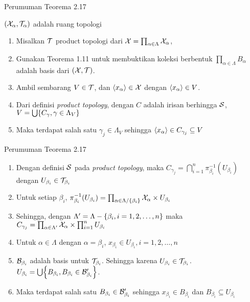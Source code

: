\begin{frame}{Perumuman Teorema 2.17}
    \begin{tcolorbox}[enhanced,title=Teorema 2.30 (Bukti), frame style tile={width=\paperwidth}{\wallpaper}]
        $(\nX_\alpha,\nT_\alpha)$ adalah ruang topologi
        \begin{enumerate}
            \item Misalkan $\nT$ product topologi dari $\nX = \prod_{\alpha \in \Lambda}\nX_\alpha$,
            \item Gunakan Teorema 1.11 untuk membuktikan koleksi berbentuk $\prod_{\alpha \in \Lambda}B_\alpha$ 
            adalah basis dari $(\nX,\nT)$.
            \item Ambil sembarang $V \in \nT$, dan $\seq*{x_\alpha} \in \nX$ dengan $\seq*{x_\alpha}\in V$.
            \item Dari definisi \textit{product topology}, dengan $C$ adalah irisan berhingga $\nS$, $V=\bigcup\set*{C_\gamma, \gamma \in \Lambda_V}$
            \item Maka terdapat salah satu $\gamma_j\in\Lambda_V$ sehingga  $\seq*{x_\alpha} \in C_{\gamma_j} \subseteq V$
        \end{enumerate}
    \end{tcolorbox}
\end{frame}

\begin{frame}{Perumuman Teorema 2.17}
    \begin{tcolorbox}[enhanced,title=Teorema 2.30 (Bukti), frame style tile={width=\paperwidth}{\wallpaper}]
        \begin{enumerate}\addtocounter{enumi}{5}
            \item Dengan definisi $\nS$ pada \textit{product topology}, maka 
            $C_{\gamma_j}=\bigcap_{i=1}^n \pi_{\beta_i}^{-1}(U_{\beta_i})$ dengan $U_{\beta_i}\in\nT_{\beta_i}$
            \item Untuk setiap $\beta_i$, $\pi_{\beta_i}^{-1}(U_{\beta_i}) = \prod_{\alpha\in\Lambda/\set{\beta_i}} \nX_\alpha \times U_{\beta_i}$
            \item Sehingga, dengan $\Lambda'=\Lambda-\set*{\beta_i,i=1,2,\dots,n}$ maka 
            $C_{\gamma_j}=\prod_{\alpha\in\Lambda'}\nX_\alpha\times\prod_{i=1}^n U_{\beta_i}$
            \item Untuk $\alpha\in\Lambda$ dengan $\alpha=\beta_i$, $x_{\beta_i} \in U_{\beta_i}, i=1,2,\dots,n$ 
            \item $\nB_{\beta_i}$ adalah basis untuk $\nT_{\beta_i}$. Sehingga karena $U_{\beta_i}\in \nT_{\beta_i}$.
            $U_{\beta_i} = \bigcup\set*{B_{\beta_i}, B_{\beta_i} \in \nB'_{\beta_i}}$.
            \item Maka terdapat salah satu $B_{\beta_i} \in \nB'_{\beta_i}$ sehingga
            $x_{\beta_i} \in B_{\beta_i}$ dan $B_{\beta_i} \subseteq U_{\beta_i}$
        \end{enumerate}
    \end{tcolorbox}
\end{frame}

